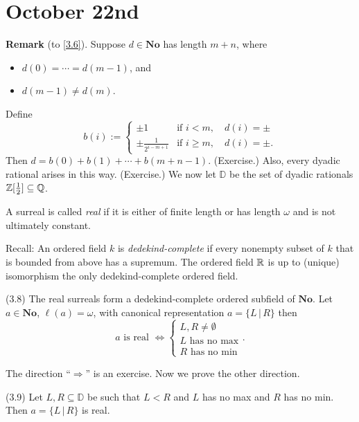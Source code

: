 \section*{October 22nd}

\textbf{Remark} (to \eqref{3.6}). Suppose $d\in\mathbf{No}$ has length $m+n$, where
\begin{itemize}
\item $d(0) = \cdots = d(m-1)$, and
\item $d(m-1)\ne d(m)$.
\end{itemize}
Define
\[ b(i) := \begin{cases} \pm 1 & \text{if } i< m, \quad d(i)=\pm \\
\pm \frac{1}{2^{i-m+1}} & \text{if } i \ge m, \quad d(i) = \pm.
\end{cases} \]
Then $d = b(0) + b(1) + \cdots + b(m+n-1)$. (Exercise.) Also, every dyadic rational arises in this way. (Exercise.)
We now let $\mathbb{D}$ be the set of dyadic rationals $\mathbb{Z}[\frac12]\subseteq\mathbb{Q}$.

\begin{defn}
A surreal is called {\em real} if it is either of finite length or has length $\omega$ and is not ultimately constant.
\end{defn}

Recall: An ordered field $k$ is {\em dedekind-complete} if every nonempty subset of $k$ that is bounded from above
has a supremum. The ordered field $\mathbb{R}$ is up to (unique) isomorphism the only dedekind-complete ordered field.

\begin{theorem}[Conway] (3.8)
The real surreals form a dedekind-complete ordered subfield of $\mathbf{No}$. Let $a\in\mathbf{No}$, $\ell(a)=\omega$,
with canonical representation $a = \{L \,|\, R\}$ then
\[ a\text{ is real } \iff \begin{cases} L,R\neq\emptyset \\
L\text{ has no max} \\
R\text{ has no min}
\end{cases}.\]
\end{theorem}

The direction ``$\Rightarrow$'' is an exercise. Now we prove the other direction.

\begin{lemma} (3.9)
Let $L,R\subseteq\mathbb{D}$ be such that $L<R$ and $L$ has no max and $R$ has no min. Then $a = \{ L \,|\, R\}$ is real.
\end{lemma}

